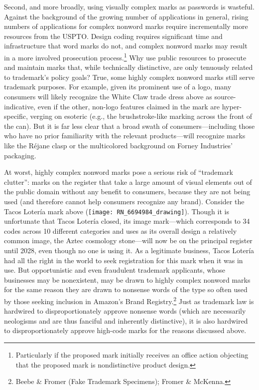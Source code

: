 \documentclass[letterpaper, 11pt, oneside]{article}
\begin{document}
Second, and more broadly, using visually complex marks as passwords is wasteful. Against the background of the growing number of applications in general, rising numbers of applications for complex nonword marks require incrementally more resources from the USPTO. Design coding requires significant time and infrastructure that word marks do not, and complex nonword marks may result in a more involved prosecution process.\footnote{Particularly if the proposed mark initially receives an office action objecting that the proposed mark is nondistinctive product design.} Why use public resources to prosecute and maintain marks that, while technically distinctive, are only tenuously related to trademark's policy goals? True, some highly complex nonword marks still serve trademark purposes. For example, given its prominent use of a logo, many consumers will likely recognize the White Claw trade dress above as source-indicative, even if the other, non-logo features claimed in the mark are hyper-specific, verging on esoteric (e.g., the brushstroke-like marking across the front of the can). But it is far less clear that a broad swath of consumers—including those who have no prior familiarity with the relevant products—will recognize marks like the Réjane clasp or the multicolored background on Forney Industries' packaging.

At worst, highly complex nonword marks pose a serious risk of ``trademark clutter'': marks on the register that take a large amount of visual elements out of the public domain without any benefit to consumers, because they are not being used (and therefore cannot help consumers recognize any brand). Consider the Tacos Lotería mark above (\texttt{[image: RN\_6694984\_drawing]}). Though it is unfortunate that Tacos Lotería closed, its image mark—which corresponds to 34 codes across 10 different categories and uses as its overall design a relatively common image, the Aztec cosmology stone—will now be on the principal register until 2028, even though no one is using it. As a legitimate business, Tacos Lotería had all the right in the world to seek registration for this mark when it was in use. But opportunistic and even fraudulent trademark applicants, whose businesses may be nonexistent, may be drawn to highly complex nonword marks for the same reason they are drawn to nonsense words of the type so often used by those seeking inclusion in Amazon's Brand Registry.\footnote{Beebe \& Fromer (Fake Trademark Specimens); Fromer \& McKenna.} Just as trademark law is hardwired to disproportionately approve nonsense words (which are necessarily neologisms and are thus fanciful and inherently distinctive), it is also hardwired to disproportionately approve high-code marks for the reasons discussed above.
\end{document}
